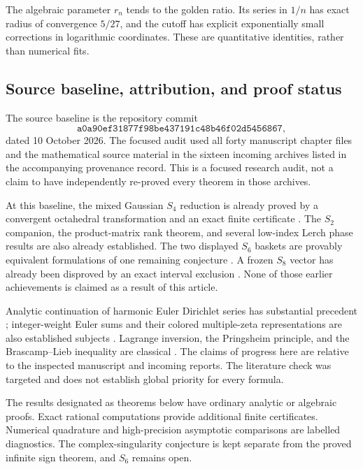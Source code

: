 \documentclass[11pt,a4paper]{article}
\theoremstyle{definition}
\theoremstyle{remark}
\numberwithin{equation}{section}
\begin{document}
The algebraic parameter $r_n$ tends to the golden ratio. Its series in $1/n$ has exact
radius of convergence $5/27$, and the cutoff has explicit exponentially
small corrections in logarithmic coordinates. These are quantitative
identities, rather than numerical fits.

\subsection{Source baseline, attribution, and proof status}
\label{sec:baseline}

The source baseline is the repository commit
\[
 \texttt{a0a90ef31877f98be437191c48b46f02d5456867},
\]
dated 10 October 2026. The focused audit used all forty manuscript chapter
files and the mathematical source material in the sixteen incoming
archives listed in the accompanying provenance record. This is a focused
research audit, not a claim to have independently re-proved every theorem
in those archives.

At this baseline, the mixed Gaussian $S_4$ reduction is already proved
by a convergent octahedral transformation and an exact finite certificate
\cite{ProjectS4}. The $S_2$ companion, the product-matrix rank theorem,
and several low-index Lerch phase results are also already established.
The two displayed $S_6$ baskets are provably equivalent formulations of
one remaining conjecture \cite{ProjectQuotients}. A frozen $S_8$ vector
has already been disproved by an exact interval exclusion
\cite{ProjectDiscovery}. None of those earlier achievements is claimed
as a result of this article.

Analytic continuation of harmonic Euler Dirichlet series has substantial
precedent \cite{BGP}; integer-weight Euler sums and their colored
multiple-zeta representations are also established subjects
\cite{XuWang}. Lagrange inversion, the Pringsheim principle, and the
Brascamp--Lieb inequality are classical \cite{Gessel2016,Flajolet,BL}.
The claims of progress here are relative to the inspected manuscript and
incoming reports. The literature check was targeted and does not establish
global priority for every formula.

The results designated as theorems below have ordinary analytic or
algebraic proofs. Exact rational computations provide additional finite
certificates. Numerical quadrature and high-precision asymptotic
comparisons are labelled diagnostics. The complex-singularity conjecture
is kept separate from the proved infinite sign theorem, and $S_6$ remains
open.
\end{document}
